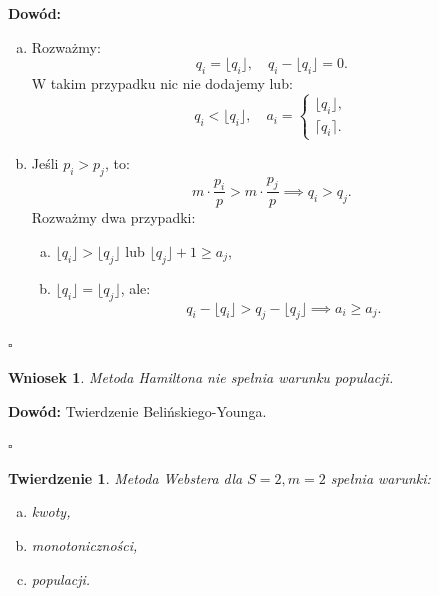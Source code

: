 \documentclass[12pt,a4paper]{article}
\theoremstyle{break}
\newtheorem{theorem}{Twierdzenie}[section]
\newtheorem{wniosek}{Wniosek}[theorem]
\begin{document}
	\noindent \textbf{Dowód:}
	\begin{enumerate}[a)]
		\item Rozważmy:
		\[
		q_i = \lfloor q_i \rfloor, \quad q_i - \lfloor q_i \rfloor = 0.
		\]
		W takim przypadku nic nie dodajemy lub:
		\[
		q_i < \lfloor q_i \rfloor, \quad a_i = 
		\begin{cases} 
			\lfloor q_i \rfloor, \\ 
			\lceil q_i \rceil.
		\end{cases}
		\]
		
		\item Jeśli $p_i > p_j$, to:
		\[
		m \cdot \frac{p_i}{p} > m \cdot \frac{p_j}{p} \implies q_i > q_j.
		\]
		Rozważmy dwa przypadki:
		\begin{enumerate}[a)]
			\item $\lfloor q_i \rfloor > \lfloor q_j \rfloor$ lub $\lfloor q_j \rfloor + 1 \geq a_j$,
			\item $\lfloor q_i \rfloor = \lfloor q_j \rfloor$, ale:
			\[
			q_i - \lfloor q_i \rfloor > q_j - \lfloor q_j \rfloor \implies a_i \geq a_j.
			\]
		\end{enumerate}
	\end{enumerate}
	\begin{flushright}
		$\square$
	\end{flushright}
	
	\begin{wniosek}
		Metoda Hamiltona nie spełnia warunku populacji.
	\end{wniosek}
	
	\noindent \textbf{Dowód:} Twierdzenie Belińskiego-Younga.
	\begin{flushright}
		$\square$
	\end{flushright}
	
	\begin{theorem}
		Metoda Webstera dla $S = 2, m = 2$ spełnia warunki:
		\begin{enumerate}[a)]
			\item kwoty,
			\item monotoniczności,
			\item populacji.
		\end{enumerate}
	\end{theorem}
	
\end{document}

